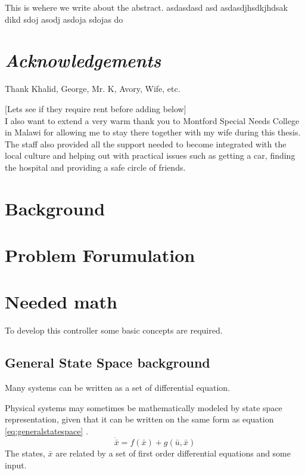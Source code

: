 \documentclass{article}
\begin{document}
\abstract
This is wehere we write about the abstract.
asdasdasd
asd
asdasdjhsdkjhdsak dikd  sdoj asodj asdoja sdojas do

\newpage
\section*{\textit{Acknowledgements}}

Thank Khalid, George, Mr. K, Avory, Wife, etc.

[Lets see if they require rent before adding below]\\
I also want to extend a very warm thank you to Montford Special Needs College in Malawi for allowing me to stay there together with my wife during this thesis.
The staff also provided all the support needed to become integrated with the local culture and helping out with practical issues such as getting a car, finding the hospital and providing a safe circle of friends.

\newpage

\tableofcontents

\newpage

\newpage

\section{Background}


\section{Problem Forumulation}


\section{Needed math}
To develop this controller some basic concepts are required.
\subsection{General State Space background}
Many systems can be written as a set of differential equation.

Physical systems may sometimes be mathematically modeled by state space representation, given that it can be written on the same form as equation \ref{eq:generalstatespace} .
\begin{equation}
    \dot{\bar{x}} = f(\bar{x}) + g(\bar{u},\bar{x})
    \label{eq:generalstatespace}
\end{equation}
The states, $\bar{x}$ are related by a set of first order differential equations and some input.
\end{document}
